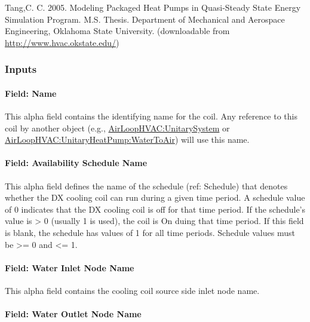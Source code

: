 Tang,C. C. 2005. Modeling Packaged Heat Pumps in Quasi-Steady State Energy Simulation Program. M.S. Thesis. Department of Mechanical and Aerospace Engineering, Oklahoma State University. (downloadable from \href{http://www.hvac.okstate.edu}{http://www.hvac.okstate.edu/})

\subsubsection{Inputs}\label{inputs-30}

\paragraph{Field: Name}\label{field-name-29}

This alpha field contains the identifying name for the coil. Any reference to this coil by another object (e.g., \hyperref[airloophvacunitarysystem]{AirLoopHVAC:UnitarySystem} or \hyperref[airloophvacunitaryheatpumpwatertoair]{AirLoopHVAC:UnitaryHeatPump:WaterToAir}) will use this name.

\paragraph{Field: Availability Schedule Name}\label{field-availability-schedule-name-16-007}

This alpha field defines the name of the schedule (ref: Schedule) that denotes whether the DX cooling coil can run during a given time period. A schedule value of 0 indicates that the DX cooling coil is off for that time period. If the schedule's value is \textgreater{} 0 (usually 1 is used), the coil is On duing that time period. If this field is blank, the schedule has values of 1 for all time periods. Schedule values must be \textgreater{}= 0 and \textless{}= 1.

\paragraph{Field: Water Inlet Node Name}\label{field-water-inlet-node-name-6-000}

This alpha field contains the cooling coil source side inlet node name.

\paragraph{Field: Water Outlet Node Name}\label{field-water-outlet-node-name-6-000}

